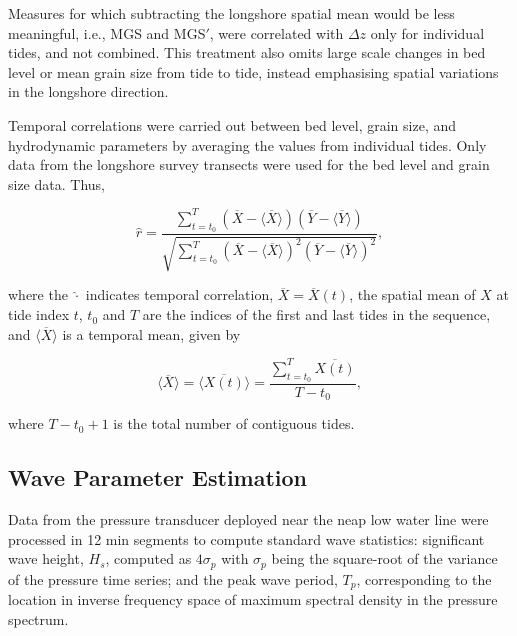 Measures for which subtracting the longshore spatial mean would be less meaningful, i.e., MGS and MGS$'$, were correlated with $\Delta z$ only for individual tides, and not combined. This treatment also omits large scale changes in bed level or mean grain size from tide to tide, instead emphasising spatial variations in the longshore direction.

Temporal correlations were carried out between bed level, grain size, and hydrodynamic parameters by averaging the values from individual tides. Only data from the longshore survey transects were used for the bed level and grain size data. Thus,

\begin{equation}\label{eq:pearsons_r_time}
\hat{r} = \frac{\sum_{t=t_0}^{T}(\overline{X} - \langle \overline{X} \rangle)(\overline{Y}-\langle \overline{Y} \rangle)}{\sqrt{\sum_{t=t_0}^{T}(\overline{X}-\langle \overline{X} \rangle)^2 (\overline{Y}-\langle \overline{Y} \rangle)^2}},
\end{equation}

\noindent where the $\hat{\cdot}$ indicates temporal correlation, $\overline{X}=\overline{X}(t)$, the spatial mean of $X$ at tide index $t$, $t_0$ and $T$ are the indices of the first and last tides in the sequence, and $\langle \overline{X} \rangle$ is a temporal mean, given by

\begin{equation}\label{eq:time_mean}
\langle \overline{X} \rangle = \langle \overline{X(t)} \rangle = \frac{\sum_{t=t_0}^{T} \overline{X(t)}}{T-t_0},
\end{equation}

\noindent where $T-t_0+1$ is the total number of contiguous tides.


\subsection{Wave Parameter Estimation}

Data from the pressure transducer deployed near the neap low water line were processed in 12 min segments to compute standard wave statistics: significant wave height, $H_s$, computed as $4\sigma_p$ with $\sigma_p$ being the square-root of the variance of the pressure time series; and the peak wave period, $T_p$, corresponding to the location in inverse frequency space of maximum spectral density in the pressure spectrum. %

